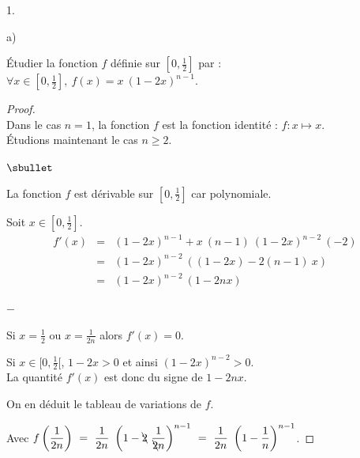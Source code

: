 \documentclass[11pt]{article}%
\begin{document}
\begin{noliste}{1.}
\item 
  \begin{noliste}{a)} 
    \setlength{\itemsep}{2mm}
  \item Étudier la fonction $f$ définie sur $\left[0, \frac{1}{2}
    \right]$ par : $\forall x \in \left[0, \frac{1}{2} \right], \ f(x)
    = x \ (1-2x)^{n-1}$.

    \begin{proof}~\\%
      Dans le cas $n = 1$, la fonction $f$ est la fonction identité :
      $f : x \mapsto x$.\\
      Étudions maintenant le cas $n \geq 2$.
      \begin{noliste}{$\sbullet$}
      \item La fonction $f$ est dérivable sur $[0, \frac{1}{2}]$ car
        polynomiale.

      \item Soit $x \in [0, \frac{1}{2}]$.
        \[
        \begin{array}{rcl}
          f'(x) & = & (1-2x)^{n-1} + x \ (n-1) \ (1-2x)^{n-2} \ (-2)
          \\[.2cm]
          & = & (1-2x)^{n-2} \ \left( (1 - 2x) - 2 (n-1) \ x \right)
          \\[.2cm]
          & = & (1-2x)^{n-2} \ \left( 1 - 2 n x \right)
        \end{array}
        \]
        \begin{noliste}{$-$}
        \item Si $x = \frac{1}{2}$ ou $x = \frac{1}{2n}$ alors $f'(x)
          = 0$.
        \item Si $x \in [0, \frac{1}{2}[$, $1 - 2x > 0$ et ainsi
          $(1-2x)^{n-2} > 0$.\\
          La quantité $f'(x)$ est donc du signe de $1 - 2 n x$.
        \end{noliste}

      \item On en déduit le tableau de variations de $f$.\\[-.2cm]
        \begin{center}
        \end{center}
      \end{noliste}
      Avec $f\left( \dfrac{1}{2n} \right) \ = \ \dfrac{1}{2n} \
      \left(1 - \bcancel{2} \ \dfrac{1}{\bcancel{2}n} \right)^{n-1} \
      = \ \dfrac{1}{2n} \ \left(1 - \dfrac{1}{n} \right)^{n-1}$.



\end{proof}
\end{noliste}
\end{noliste}
\end{document}
